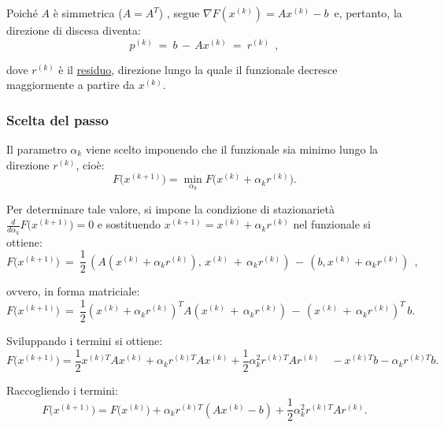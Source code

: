 Poiché $A$ è simmetrica ($A = A^T$) , segue $\nabla F(x^{(k)}) = A x^{(k)} - b\,$ e, pertanto, la direzione di discesa diventa:
\begin{equation}
	\boxed{p^{(k)}\ =\ b\, -\, A x^{(k)}\ =\ r^{(k)}}\ \ ,
\end{equation}

dove $r^{(k)}$ è il \underline{residuo}, direzione lungo la quale il funzionale decresce maggiormente a partire da $x^{(k)}$.

%
%
%
\subsubsection{Scelta del passo}

Il parametro $\alpha_k$ viene scelto imponendo che il funzionale sia minimo lungo la direzione $r^{(k)}$, cioè:
\begin{equation}
	F\big(x^{(k+1)}\big) = \min_{\alpha_k} F\big(x^{(k)} + \alpha_k r^{(k)}\big).
\end{equation}

Per determinare tale valore, si impone la condizione di stazionarietà $\frac{d}{d\alpha_k} F\big(x^{(k+1)}\big) = 0$ e sostituendo $x^{(k+1)} = x^{(k)} + \alpha_k r^{(k)}$ nel funzionale si ottiene:
\begin{equation*}
	F\big(x^{(k+1)}\big)\ =\ \frac{1}{2}\, \left( A(x^{(k)} + \alpha_k r^{(k)}), \, x^{(k)}\, +\, \alpha_k r^{(k)} \right) 
	\, -\, \left( b, x^{(k)} + \alpha_k r^{(k)} \right)\ \ ,
\end{equation*}

ovvero, in forma matriciale:
\begin{equation*}
	F\big(x^{(k+1)}\big)\ =\ \frac{1}{2} (x^{(k)} + \alpha_k r^{(k)})^T A (x^{(k)}\, +\, \alpha_k r^{(k)}) 
	\, -\, (x^{(k)}\, +\, \alpha_k r^{(k)})^T\, b.
\end{equation*}

Sviluppando i termini si ottiene:
\begin{equation*}
	F\big(x^{(k+1)}\big)
	= \frac{1}{2} x^{(k)T} A x^{(k)}
	+ \alpha_k r^{(k)T} A x^{(k)}
	+ \frac{1}{2} \alpha_k^2 r^{(k)T} A r^{(k)}
	\quad - x^{(k)T} b - \alpha_k r^{(k)T} b.
\end{equation*}

Raccogliendo i termini:
\begin{equation*}
	F\big(x^{(k+1)}\big)
	= F\big(x^{(k)}\big)
	+ \alpha_k r^{(k)T} (A x^{(k)} - b)
	+ \frac{1}{2} \alpha_k^2 r^{(k)T} A r^{(k)}.
\end{equation*}

